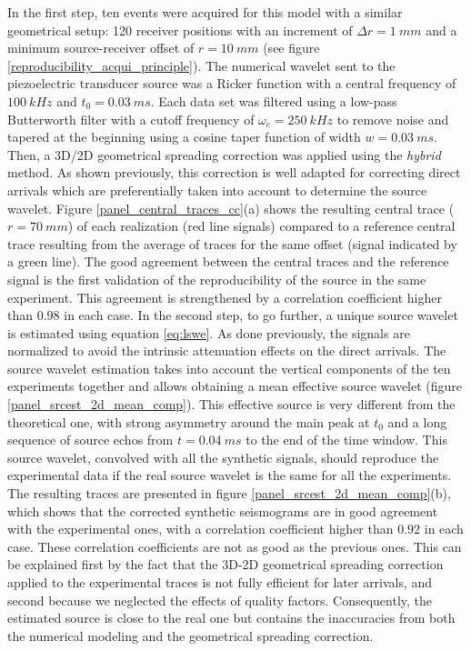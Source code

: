 \documentclass[manuscript,revised]{geophysics}
\begin{document}
\noindent In the first step, ten events were acquired for this model with a similar geometrical setup: 120 receiver positions with an increment of $\Delta r= 1\ mm$ and a minimum source-receiver offset of $r=10\ mm$ (see figure \ref{reproducibility_acqui_principle}). The numerical wavelet sent to the piezoelectric transducer source was a Ricker function with a central frequency of $100\ kHz$ and $t_{0}=0.03\ ms$. Each data set was filtered using a low-pass Butterworth filter with a cutoff frequency of $\omega_{c}=250\ kHz$ to remove noise and tapered at the beginning using a cosine taper function of width $w=0.03\ ms$. Then, a 3D/2D geometrical spreading correction was applied using the \textit{hybrid} method. As shown previously, this correction is well adapted for correcting direct arrivals which are preferentially taken into account to determine the source wavelet. Figure \ref{panel_central_traces_cc}(a) shows the resulting central trace ($r=70\ mm$) of each realization (red line signals) compared to a reference central trace resulting from the average of traces for the same offset (signal indicated by a green line). The good agreement between the central traces and the reference signal is the first validation of the reproducibility of the source in the same experiment. This agreement is strengthened by a correlation coefficient higher than $0.98$ in each case. In the second step, to go further, a unique source wavelet is estimated using equation \ref{eq:lswe}. As done previously, the signals are normalized to avoid the intrinsic attenuation effects on the direct arrivals. The source wavelet estimation takes into account the vertical components of the ten experiments together and allows obtaining a mean effective source wavelet (figure \ref{panel_srcest_2d_mean_comp}). This effective source is very different from the theoretical one, with strong asymmetry around the main peak at $t_{0}$ and a long sequence of source echos from $t=0.04\ ms$ to the end of the time window. This source wavelet, convolved with all the synthetic signals, should reproduce the experimental data if the real source wavelet is the same for all the experiments. The resulting traces are presented in figure \ref{panel_srcest_2d_mean_comp}(b), which shows that the corrected synthetic seismograms are in good agreement with the experimental ones, with a correlation coefficient higher than $0.92$ in each case. These correlation coefficients are not as good as the previous ones. This can be explained first by the fact that the 3D-2D geometrical spreading correction applied to the experimental traces is not fully efficient for later arrivals, and second because we neglected the effects of quality factors. Consequently, the estimated source is close to the real one but contains the inaccuracies from both the numerical modeling and the geometrical spreading correction. 
\end{document}
